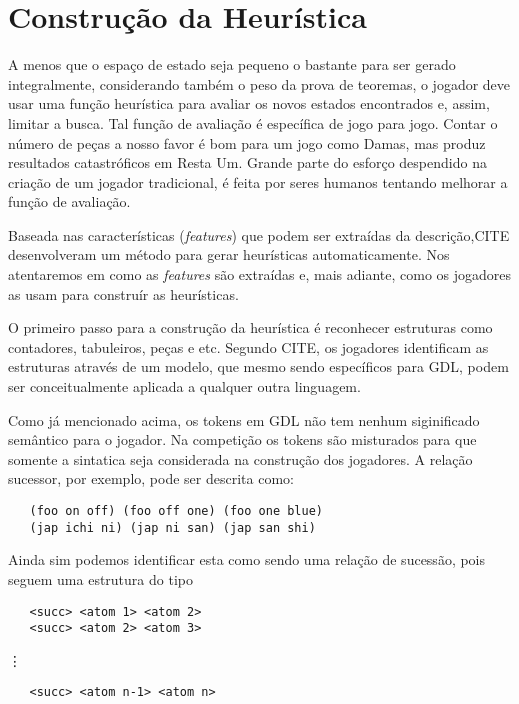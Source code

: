 \section{Construção da Heurística}
A menos que o espaço de estado seja pequeno o bastante para ser gerado
integralmente, considerando também o peso da prova de teoremas, o jogador deve
usar uma função heurística para avaliar os novos estados encontrados e, assim,
limitar a busca. Tal função de avaliação é específica de jogo para jogo. Contar
o número de peças a nosso favor é bom para um jogo como Damas, mas produz
resultados catastróficos em Resta Um. Grande parte do esforço despendido na
criação de um jogador tradicional, é feita por seres humanos tentando melhorar a
função de avaliação.

Baseada nas características ({\it features}) que podem ser extraídas da
descrição,CITE desenvolveram
um método para gerar heurísticas automaticamente. Nos atentaremos em como as
{\it features} são extraídas e, mais adiante, como os jogadores as usam para
construír as heurísticas.

O primeiro passo para a construção da heurística é reconhecer estruturas como
contadores, tabuleiros, peças e etc. Segundo CITE, os jogadores identificam as estruturas através de um
modelo, que mesmo sendo específicos para GDL, podem ser conceitualmente aplicada
a qualquer outra linguagem.

Como já mencionado acima, os tokens em GDL não tem nenhum siginificado semântico
para o jogador. Na competição os tokens são misturados para que somente a
sintatica seja considerada na construção dos jogadores. A relação sucessor, por
exemplo, pode ser descrita como:
\begin{verbatim}
   (foo on off) (foo off one) (foo one blue)
   (jap ichi ni) (jap ni san) (jap san shi)
\end{verbatim}
Ainda sim podemos identificar esta como sendo uma relação de sucessão, pois
seguem uma estrutura do tipo
\begin{verbatim}
   <succ> <atom 1> <atom 2>
   <succ> <atom 2> <atom 3>
\end{verbatim}
\hspace{2cm} \vdots
\begin{verbatim}
   <succ> <atom n-1> <atom n>   
\end{verbatim}
